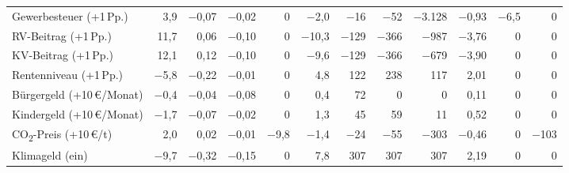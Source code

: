 \begin{tabular}{@{}l*{11}{r}@{}}
Gewerbesteuer (+1\,Pp.) & \cellcolor{pos!31}3,9 & \cellcolor{pos!25}$-$0,07 & \cellcolor{pos!16}$-$0,02 & \textcolor{grau}{0} & \cellcolor{neg!23}$-$2,0 & \cellcolor{neg!15}$-$16 & \cellcolor{neg!20}$-$52 & \cellcolor{neg!70}$-$3.128 & \cellcolor{pos!26}$-$0,93 & \cellcolor{neg!36}$-$6,5 & \textcolor{grau}{0} \\
RV-Beitrag (+1\,Pp.) & \cellcolor{pos!68}11,7 & \cellcolor{neg!24}0,06 & \cellcolor{pos!33}$-$0,10 & \textcolor{grau}{0} & \cellcolor{neg!70}$-$10,3 & \cellcolor{neg!36}$-$129 & \cellcolor{neg!70}$-$366 & \cellcolor{neg!30}$-$987 & \cellcolor{pos!68}$-$3,76 & \textcolor{grau}{0} & \textcolor{grau}{0} \\
KV-Beitrag (+1\,Pp.) & \cellcolor{pos!70}12,1 & \cellcolor{neg!34}0,12 & \cellcolor{pos!33}$-$0,10 & \textcolor{grau}{0} & \cellcolor{neg!66}$-$9,6 & \cellcolor{neg!36}$-$129 & \cellcolor{neg!70}$-$366 & \cellcolor{neg!25}$-$679 & \cellcolor{pos!70}$-$3,90 & \textcolor{grau}{0} & \textcolor{grau}{0} \\
Rentenniveau (+1\,Pp.) & \cellcolor{neg!40}$-$5,8 & \cellcolor{pos!51}$-$0,22 & \cellcolor{pos!13}$-$0,01 & \textcolor{grau}{0} & \cellcolor{pos!39}4,8 & \cellcolor{pos!35}122 & \cellcolor{pos!50}238 & \cellcolor{pos!14}117 & \cellcolor{neg!42}2,01 & \textcolor{grau}{0} & \textcolor{grau}{0} \\
Bürgergeld (+10\,\euro{}/Monat) & \cellcolor{neg!14}$-$0,4 & \cellcolor{pos!20}$-$0,04 & \cellcolor{pos!27}$-$0,08 & \textcolor{grau}{0} & \cellcolor{pos!14}0,4 & \cellcolor{pos!26}72 & \textcolor{grau}{0} & \textcolor{grau}{0} & \cellcolor{neg!14}0,11 & \textcolor{grau}{0} & \textcolor{grau}{0} \\
Kindergeld (+10\,\euro{}/Monat) & \cellcolor{neg!20}$-$1,7 & \cellcolor{pos!24}$-$0,07 & \cellcolor{pos!16}$-$0,02 & \textcolor{grau}{0} & \cellcolor{pos!19}1,3 & \cellcolor{pos!20}45 & \cellcolor{pos!21}59 & \cellcolor{pos!12}11 & \cellcolor{neg!20}0,52 & \textcolor{grau}{0} & \textcolor{grau}{0} \\
CO\textsubscript{2}-Preis (+10\,\euro{}/t) & \cellcolor{pos!22}2,0 & \cellcolor{neg!16}0,02 & \cellcolor{pos!14}$-$0,01 & \cellcolor{pos!70}$-$9,8 & \cellcolor{neg!20}$-$1,4 & \cellcolor{neg!17}$-$24 & \cellcolor{neg!21}$-$55 & \cellcolor{neg!18}$-$303 & \cellcolor{pos!19}$-$0,46 & \textcolor{grau}{0} & \cellcolor{pos!70}$-$103 \\
Klimageld (ein) & \cellcolor{neg!58}$-$9,7 & \cellcolor{pos!70}$-$0,32 & \cellcolor{pos!43}$-$0,15 & \textcolor{grau}{0} & \cellcolor{pos!56}7,8 & \cellcolor{pos!70}307 & \cellcolor{pos!61}307 & \cellcolor{pos!18}307 & \cellcolor{neg!45}2,19 & \textcolor{grau}{0} & \textcolor{grau}{0} \\
\bottomrule
\end{tabular}
